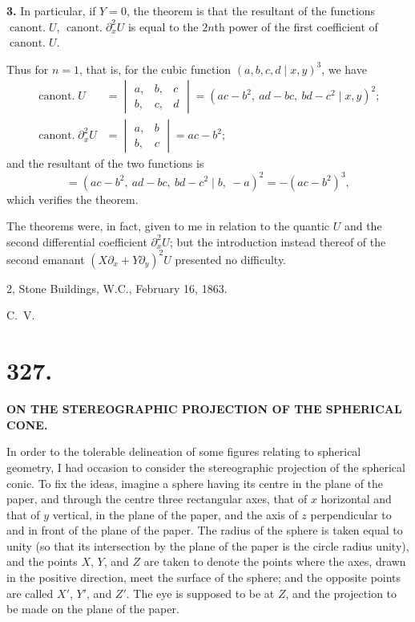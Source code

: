 \documentclass[11pt,a4paper]{article}
\newcommand{\canont}{\operatorname{canont.}}
\begin{document}
\medskip
\noindent \textbf{3.} In particular, if $Y=0$, the theorem is that the resultant of the functions $\canont U$, $\canont \partial_x^2 U$ is equal to the $2n$th power of the first coefficient of $\canont U$.

Thus for $n=1$, that is, for the cubic function $(a,b,c,d\mid x,y)^3$, we have
\begin{align*}
\canont U &= \begin{vmatrix} a, & b, & c \\ b, & c, & d \end{vmatrix}
= (ac-b^2,\ ad-bc,\ bd-c^2\mid x,y)^2;\\
\canont \partial_x^2 U &= \begin{vmatrix} a, & b \\ b, & c \end{vmatrix} = ac-b^2;
\end{align*}
and the resultant of the two functions is
\[
= (ac-b^2,\ ad-bc,\ bd-c^2\mid b,\ -a)^2 = -(ac-b^2)^3,
\]
which verifies the theorem.

The theorems were, in fact, given to me in relation to the quantic $U$ and the second differential coefficient $\partial_x^2 U$; but the introduction instead thereof of the second emanant $(X\partial_x + Y\partial_y)^2 U$ presented no difficulty.

\begin{flushright}
2, Stone Buildings, W.C., February 16, 1863.
\end{flushright}
\noindent C.\ V.


\newpage
\section*{327.}

\begin{center}
\textbf{ON THE STEREOGRAPHIC PROJECTION OF THE SPHERICAL CONE.}
\end{center}


\bigskip

\noindent In order to the tolerable delineation of some figures relating to spherical geometry, I had occasion to consider the stereographic projection of the spherical conic. To fix the ideas, imagine a sphere having its centre in the plane of the paper, and through the centre three rectangular axes, that of $x$ horizontal and that of $y$ vertical, in the plane of the paper, and the axis of $z$ perpendicular to and in front of the plane of the paper. The radius of the sphere is taken equal to unity (so that its intersection by the plane of the paper is the circle radius unity), and the points $X$, $Y$, and $Z$ are taken to denote the points where the axes, drawn in the positive direction, meet the surface of the sphere; and the opposite points are called $X'$, $Y'$, and $Z'$. The eye is supposed to be at $Z$, and the projection to be made on the plane of the paper.
\end{document}
